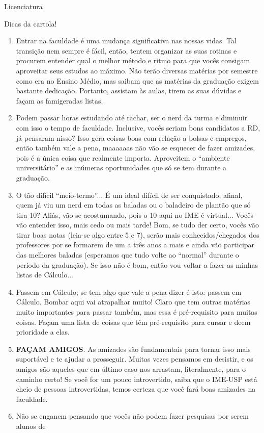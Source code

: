 \begin{subsecao}{Licenciatura}
\begin{subsubsecao}{Dicas da cartola!}
\begin{enumerate}
\item Entrar na faculdade é uma mudança significativa nas nossas vidas. Tal transição
nem sempre é fácil, então, tentem organizar as suas rotinas e procurem entender qual
o melhor método e ritmo para que vocês consigam aproveitar seus estudos ao máximo. Não
terão diversas matérias por semestre como era no Ensino Médio, mas saibam que as matérias
da graduação exigem bastante dedicação. Portanto, assistam às aulas, tirem as suas dúvidas
e façam as famigeradas listas.
\item Podem passar horas estudando até rachar, ser o nerd da turma e diminuir com
 isso o tempo de faculdade. Inclusive, vocês seriam bons candidatos a RD, já pensaram nisso? 
Isso gera coisas boas com relação a bolsas e empregos, então também vale a pena, 
maaaaaas não vão se esquecer de fazer amizades, pois é a única coisa que realmente importa.
Aproveitem o ``ambiente universitário'' e as inúmeras oportunidades que só se tem durante
a graduação.
\item O tão difícil ``meio-termo''... É um ideal difícil de ser conquistado; afinal,
  quem já viu um nerd em todas as baladas ou o baladeiro de plantão que só tira
  10? Aliás, vão se acostumando, pois o 10 aqui no IME é virtual... Vocês vão
  entender isso, mais cedo ou mais tarde! Bom, se tudo der certo, vocês vão
  tirar boas notas (leia-se algo entre 5 e 7), serão mais conhecidos/chegados
  dos professores por se formarem de um a três anos a mais e ainda
  vão participar das melhores baladas (esperamos que tudo volte ao ``normal'' durante
  o período da graduação). %
  Se isso não é bom, então vou voltar a fazer as minhas listas de Cálculo...
\item Passem em Cálculo; se tem algo que vale a pena dizer é isto: passem em
  Cálculo. Bombar aqui vai atrapalhar muito! Claro que tem outras matérias muito
  importantes para passar também, mas essa é pré-requisito para muitas coisas.
  Façam uma lista de coisas que têm pré-requisito para cursar e deem prioridade
  a elas. 
  \item \textbf{FAÇAM AMIGOS}. As amizades são fundamentais para tornar isso
mais suportável e te ajudar a prosseguir. Muitas vezes pensamos em desistir,
 e os amigos são aqueles que em último caso nos arrastam, literalmente, para o caminho certo!
 Se você for um pouco introvertido, saiba que o IME-USP está cheio de pessoas introvertidas, 
 temos certeza que você fará boas amizades na faculdade.
 \item Não se enganem pensando que vocês não podem fazer pesquisas por serem alunos de

\end{enumerate}
\end{subsubsecao}
\end{subsecao}
